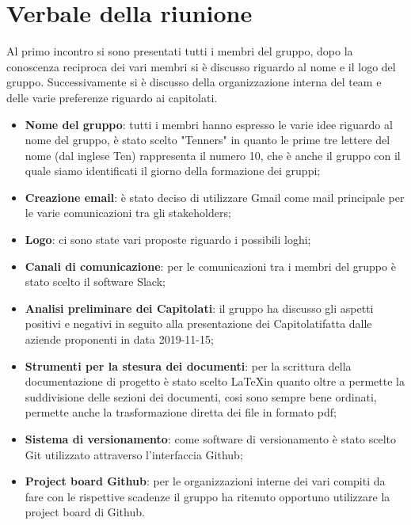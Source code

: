\section{Verbale della riunione}
		Al primo incontro si sono presentati tutti i membri del gruppo, dopo la conoscenza reciproca dei vari membri si è discusso riguardo al nome e il logo del gruppo. Successivamente si è discusso della organizzazione interna del team e delle varie preferenze riguardo ai capitolati\glos. 
	\begin{itemize}
		\item \textbf {Nome del gruppo}: tutti i membri hanno espresso le varie idee riguardo al nome del gruppo, è stato scelto "Tenners" in quanto le prime tre lettere del nome (dal inglese Ten) rappresenta il numero 10, che è anche il gruppo con il quale siamo identificati il giorno della formazione dei gruppi;
		\item \textbf {Creazione email}: è stato deciso di utilizzare Gmail come mail principale per le varie comunicazioni tra gli stakeholders\glos;
		\item \textbf {Logo}: ci sono state vari proposte riguardo i possibili loghi;
		\item \textbf {Canali di comunicazione}: per le comunicazioni tra i membri del gruppo è stato scelto il software Slack\glos;
		\item \textbf {Analisi preliminare dei Capitolati\glos}: il gruppo ha discusso gli aspetti positivi e negativi in seguito alla presentazione dei Capitolati\glo fatta dalle aziende proponenti in data 2019-11-15;
		\item \textbf {Strumenti per la stesura dei documenti}: per la scrittura della documentazione di progetto è stato scelto \LaTeX  in quanto oltre a permette la suddivisione delle sezioni dei documenti, cosi sono sempre bene ordinati, permette anche la trasformazione diretta dei file in formato pdf;
		\item \textbf {Sistema di versionamento}: come software di versionamento è stato scelto Git utilizzato attraverso l'interfaccia Github;
		\item \textbf {Project board Github}: per le organizzazioni interne dei vari compiti da fare con le rispettive scadenze il gruppo ha ritenuto opportuno utilizzare la project board di Github.
	\end{itemize}

